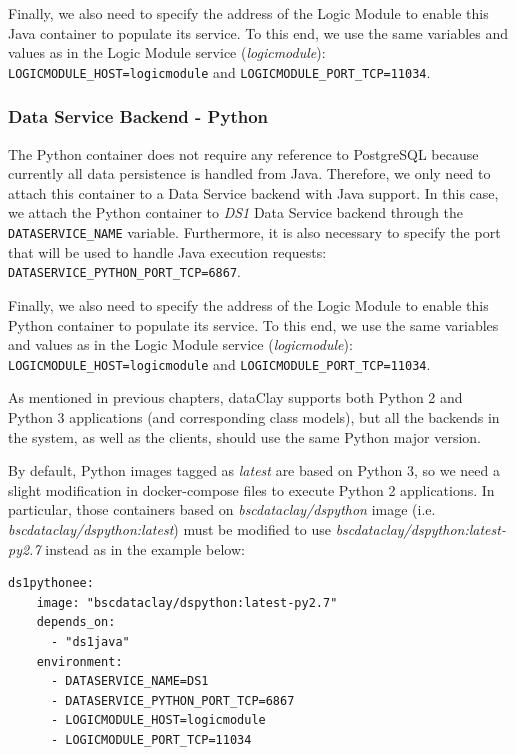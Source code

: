 Finally, we also need to specify the address of the Logic Module to enable this Java container to populate its service. To this end, we use the same variables and values as in the Logic Module service (\textit{logicmodule}): \texttt{LOGICMODULE\_HOST=logicmodule} and \texttt{LOGICMODULE\_PORT\_TCP=11034}.

\subsubsection{Data Service Backend - Python}
The Python container does not require any reference to PostgreSQL because currently all data persistence is handled from Java. Therefore, we only need to attach this container to a Data Service backend with Java support. In this case, we attach the Python container to \textit{DS1} Data Service backend through the \texttt{DATASERVICE\_NAME} variable. Furthermore, it is also necessary to specify the port that will be used to handle Java execution requests: \texttt{DATASERVICE\_PYTHON\_PORT\_TCP=6867}.

Finally, we also need to specify the address of the Logic Module to enable this Python container to populate its service. To this end, we use the same variables and values as in the Logic Module service (\textit{logicmodule}): \texttt{LOGICMODULE\_HOST=logicmodule} and \texttt{LOGICMODULE\_PORT\_TCP=11034}.

As mentioned in previous chapters, dataClay supports both Python 2 and Python 3 applications (and corresponding class models), but all the backends in the system, as well as the clients, should use the same Python major version.

By default, Python images tagged as \textit{latest} are based on Python 3, so we need a slight modification in docker-compose files to execute Python 2 applications. In particular, those containers based on \textit{bscdataclay/dspython} image (i.e. \textit{bscdataclay/dspython:latest}) must be modified to use \textit{bscdataclay/dspython:latest-py2.7} instead as in the example below:

\begin{tBox}
 \begin{lstlisting}[language=docker-compose-2, frame=none]
  ds1pythonee:
    image: "bscdataclay/dspython:latest-py2.7"
    depends_on:
      - "ds1java"
    environment:
      - DATASERVICE_NAME=DS1
      - DATASERVICE_PYTHON_PORT_TCP=6867
      - LOGICMODULE_HOST=logicmodule
      - LOGICMODULE_PORT_TCP=11034
 \end{lstlisting}
\end{tBox}


